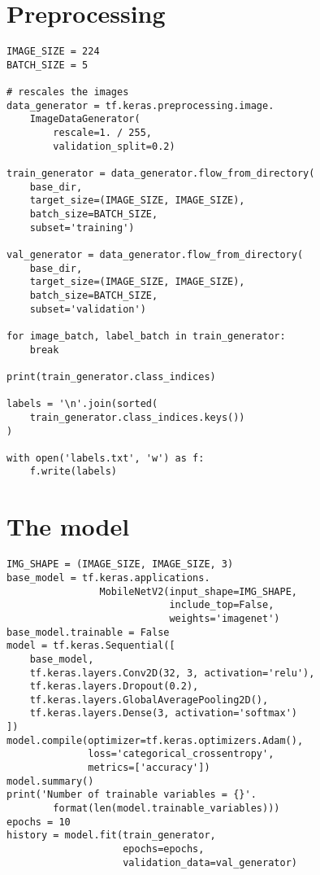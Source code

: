 \documentclass[12pt]{article}
\begin{document}
\begin{appendices}

\section{Preprocessing}
\label{appendix:Preprocessing}
\begin{lstlisting}
IMAGE_SIZE = 224
BATCH_SIZE = 5

# rescales the images
data_generator = tf.keras.preprocessing.image.
    ImageDataGenerator(
        rescale=1. / 255,
        validation_split=0.2)

train_generator = data_generator.flow_from_directory(
    base_dir,
    target_size=(IMAGE_SIZE, IMAGE_SIZE),
    batch_size=BATCH_SIZE,
    subset='training')

val_generator = data_generator.flow_from_directory(
    base_dir,
    target_size=(IMAGE_SIZE, IMAGE_SIZE),
    batch_size=BATCH_SIZE,
    subset='validation')

for image_batch, label_batch in train_generator:
    break

print(train_generator.class_indices)

labels = '\n'.join(sorted(
    train_generator.class_indices.keys())
)

with open('labels.txt', 'w') as f:
    f.write(labels)
\end{lstlisting}

\section{The model}
\label{appendix:model}
\begin{lstlisting}
IMG_SHAPE = (IMAGE_SIZE, IMAGE_SIZE, 3)
base_model = tf.keras.applications.
                MobileNetV2(input_shape=IMG_SHAPE,
                            include_top=False,
                            weights='imagenet')
base_model.trainable = False
model = tf.keras.Sequential([
    base_model, 
    tf.keras.layers.Conv2D(32, 3, activation='relu'),  
    tf.keras.layers.Dropout(0.2),  
    tf.keras.layers.GlobalAveragePooling2D(),  
    tf.keras.layers.Dense(3, activation='softmax')  
])
model.compile(optimizer=tf.keras.optimizers.Adam(),  
              loss='categorical_crossentropy', 
              metrics=['accuracy'])  
model.summary()
print('Number of trainable variables = {}'.
        format(len(model.trainable_variables)))
epochs = 10
history = model.fit(train_generator,
                    epochs=epochs,
                    validation_data=val_generator)
\end{lstlisting}


\end{appendices}
\end{document}
